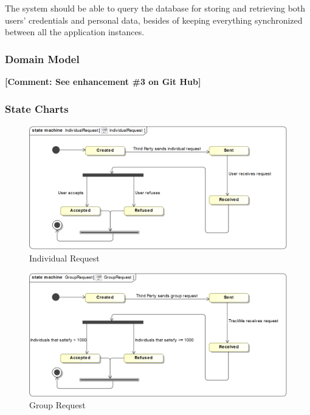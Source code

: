\documentclass[a4paper]{article}
\newcommand{\comment}[1]{\textbf{[Comment: #1]}}
\begin{document}
    The system should be able to query the database for storing and retrieving both users' credentials and personal data, besides of keeping everything synchronized between all the application instances.

    \subsubsection{Domain Model}
    \comment{See enhancement \#3 on Git Hub}
    \newpage
    \subsubsection{State Charts}
    \begin{figure}[!ht]
        \centering
        \includegraphics[width=\textwidth, keepaspectratio]{images/UML/state_individualRequest.png}
        \caption{Individual Request}
        \label{fig:state_individual}
    \end{figure}
    \begin{figure}[!ht]
        \centering
        \includegraphics[width=\textwidth, keepaspectratio]{images/UML/state_groupRequest.png}
        \caption{Group Request}
        \label{fig:state_group}
    \end{figure}
\end{document}

